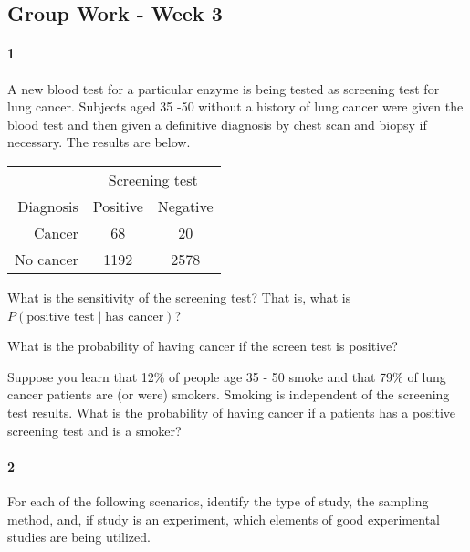 \documentclass{article}
\begin{document}
\begin{flushleft}
\section*{Group Work - Week 3}

\paragraph{1} A new blood test for a particular enzyme is being tested as screening test for lung cancer. Subjects aged 35 -50 without a history of lung cancer were given the blood test and then given a definitive diagnosis by chest scan and biopsy if necessary. The results are below.\\ \medskip
{\centering
\begin{tabular}{ r| c c}
& \multicolumn{2}{c}{Screening test}\\
Diagnosis & Positive & Negative\\
\hline
 Cancer &  68  &  20  \\
 No cancer  & 1192   &  2578 \\
\end{tabular}
\par}


\begin{enumalpha}
\item What is the sensitivity of the screening test? That is, what is $P(\text{positive test} \mid \text{has cancer})$?
\vspace{1.75in}

\item What is the probability of having cancer if the screen test is positive?
\vspace{1.75in}

\item Suppose you learn that 12\% of people age 35 - 50 smoke and that 79\% of lung cancer patients are (or were) smokers. Smoking is independent of the screening test results. What is the probability of having cancer if a patients has a positive screening test and is a smoker?\\

\end{enumalpha}

\newpage
\paragraph{2} For each of the following scenarios, identify the type of study, the sampling method, and, if study is an experiment, which elements of good experimental studies are being utilized.


\end{flushleft}
\end{document}
